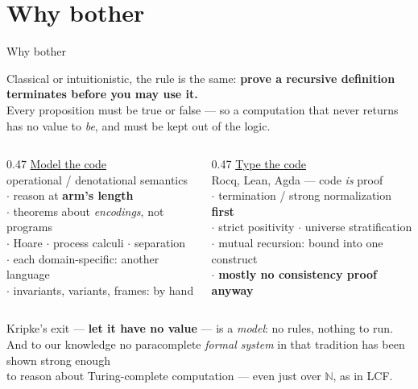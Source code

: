 \documentclass[aspectratio=169,11pt]{beamer}
\newcommand{\key}[1]{{\color{accent}\textbf{#1}}}
\newcommand{\bad}[1]{{\color{warn}\textbf{#1}}}
\begin{document}
\section{Why bother}

\begin{frame}{Why bother}
  \vspace{-0.2em}
  \begin{center}\small
    Classical or intuitionistic, the rule is the same:
    \key{prove a recursive definition terminates before you may use it.}\\[0.2em]
    {\footnotesize Every proposition must be true or false --- so a computation that
     never returns has no value to \emph{be}, and must be kept out of the logic.}
  \end{center}
  \vspace{0.5em}
  \begin{columns}[T]
    \begin{column}{0.47\textwidth}
      \underline{Model the code}\\
      {\footnotesize\color{soft} operational / denotational semantics}\\[0.6em]
      \small
      $\cdot$ reason at \key{arm's length}\\[0.3em]
      $\cdot$ theorems about \emph{encodings}, not programs\\[0.3em]
      $\cdot$ Hoare $\cdot$ process calculi $\cdot$ separation\\[0.3em]
      $\cdot$ each domain-specific: another language\\[0.3em]
      $\cdot$ invariants, variants, frames: by hand
    \end{column}
    \begin{column}{0.47\textwidth}
      \underline{Type the code}\\
      {\footnotesize\color{soft} Rocq, Lean, Agda --- code \emph{is} proof}\\[0.6em]
      \small
      $\cdot$ termination / strong normalization \key{first}\\[0.3em]
      $\cdot$ strict positivity $\cdot$ universe stratification\\[0.3em]
      $\cdot$ mutual recursion: bound into one construct\\[0.3em]
      $\cdot$ \bad{mostly no consistency proof anyway}
    \end{column}
  \end{columns}
  \vfill
  \pause
  \begin{center}\small
    Kripke's exit --- \key{let it have no value} --- is a \emph{model}: no rules, nothing to run.\\[0.2em]
    {\footnotesize And to our knowledge no paracomplete \emph{formal system} in that tradition has been
     shown strong enough\\ to reason about Turing-complete computation --- even just over
     $\mathbb{N}$, as in LCF.}
  \end{center}
\end{frame}
\end{document}
